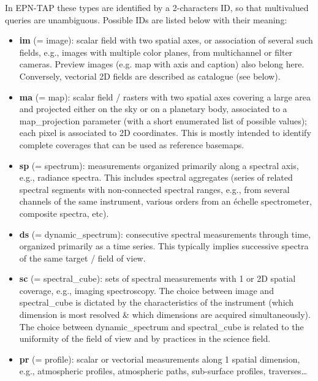 \documentclass[11pt,a4paper]{ivoa}
\begin{document}
In EPN-TAP these types are identified by a 2-characters ID, so that multivalued queries are unambiguous. Possible IDs are listed below with their meaning:

\begin{itemize}

\item \textbf{im }(= image): scalar field with two spatial axes, or association of several such fields, e.g., images with multiple color planes, from multichannel or filter cameras. Preview images (e.g. map with axis and caption) also belong here. Conversely, vectorial 2D fields are described as catalogue (see below).

\item \textbf{ma }(= map): scalar field / rasters with two spatial axes covering a large area and projected either on the sky or on a planetary body, associated to a map\_projection parameter (with a short enumerated list of possible values); each pixel is associated to 2D coordinates. This is mostly intended to identify complete coverages that can be used as reference basemaps. 

\item \textbf{sp }(= spectrum): measurements organized primarily along a spectral axis, e.g., radiance spectra. This includes spectral aggregates (series of related spectral segments with non-connected spectral ranges, e.g., from several channels of the same instrument, various orders from an échelle spectrometer, composite spectra, etc).

\item \textbf{ds }(= dynamic\_spectrum): consecutive spectral measurements through time, organized primarily as a time series. This typically implies successive spectra of the same target / field of view.

\item \textbf{sc }(= spectral\_cube): sets of spectral measurements with 1 or 2D spatial coverage, e.g., imaging spectroscopy. The choice between image and spectral\_cube is dictated by the characteristics of the instrument (which dimension is most resolved \& which dimensions are acquired simultaneously). The choice between dynamic\_spectrum and spectral\_cube is related to the uniformity of the field of view and by practices in the science field.

\item \textbf{pr }(= profile): scalar or vectorial measurements along 1 spatial dimension, e.g., atmospheric profiles, atmospheric paths, sub-surface profiles, traverses…


\end{itemize}
\end{document}
